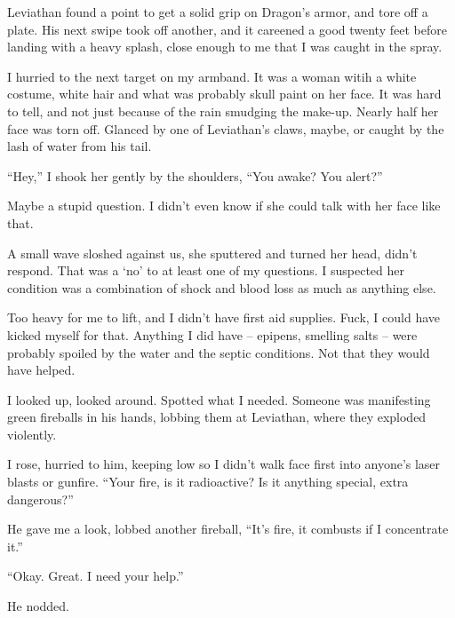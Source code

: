 Leviathan found a point to get a solid grip on Dragon's armor, and tore off a plate.  His next swipe took off another, and it careened a good twenty feet before landing with a heavy splash, close enough to me that I was caught in the spray.



I hurried to the next target on my armband.  It was a woman witih a white costume, white hair and what was probably skull paint on her face.  It was hard to tell, and not just because of the rain smudging the make-up.  Nearly half her face was torn off.  Glanced by one of Leviathan's claws, maybe, or caught by the lash of water from his tail.



``Hey,'' I shook her gently by the shoulders, ``You awake?  You alert?''



Maybe a stupid question.  I didn't even know if she could talk with her face like that.



A small wave sloshed against us, she sputtered and turned her head, didn't respond.  That was a `no' to at least one of my questions.  I suspected her condition was a combination of shock and blood loss as much as anything else.



Too heavy for me to lift, and I didn't have first aid supplies.  Fuck, I could have kicked myself for that.  Anything I did have – epipens, smelling salts – were probably spoiled by the water and the septic conditions.  Not that they would have helped.



I looked up, looked around.  Spotted what I needed.  Someone was manifesting green fireballs in his hands, lobbing them at Leviathan, where they exploded violently.



I rose, hurried to him, keeping low so I didn't walk face first into anyone's laser blasts or gunfire.  ``Your fire, is it radioactive? Is it anything special, extra dangerous?''



He gave me a look, lobbed another fireball, ``It's fire, it combusts if I concentrate it.''



``Okay.  Great.  I need your help.''



He nodded.



